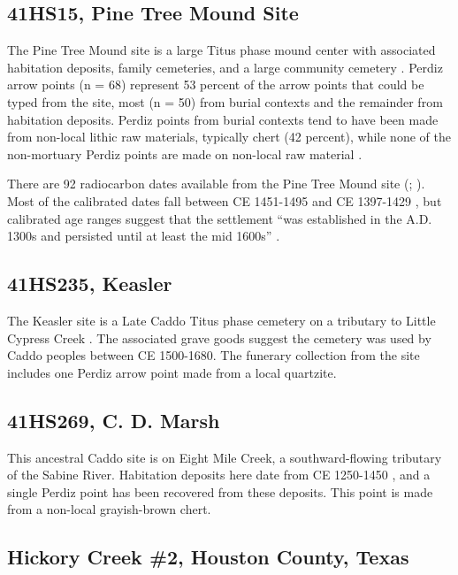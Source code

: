 \documentclass[review]{elsarticle}
\begin{document}
\subsection*{41HS15, Pine Tree Mound Site}

The Pine Tree Mound site is a large Titus phase mound center with associated habitation deposits, family cemeteries, and a large community cemetery \citep{RN5724}. Perdiz arrow points (n = 68) represent 53 percent of the arrow points that could be typed from the site, most (n = 50) from burial contexts and the remainder from habitation deposits. Perdiz points from burial contexts tend to have been made from non-local lithic raw materials, typically chert (42 percent), while none of the non-mortuary Perdiz points are made on non-local raw material \citep[566]{RN5724}.

There are 92 radiocarbon dates available from the Pine Tree Mound site  (\citealp[Table 4.13]{RN5724}; \citealp[Table 2]{RN2944}). Most of the calibrated dates fall between CE 1451-1495 and CE 1397-1429 \citep[Table 3]{RN2944}, but calibrated age ranges suggest that the settlement “was established in the A.D. 1300s and persisted until at least the mid 1600s” \citep[299]{RN5724}.

\subsection*{41HS235, Keasler}

The Keasler site is a Late Caddo Titus phase cemetery on a tributary to Little Cypress Creek \citep{RN8983}. The associated grave goods suggest the cemetery was used by Caddo peoples between CE 1500-1680. The funerary collection from the site includes one Perdiz arrow point made from a local quartzite.

\subsection*{41HS269, C. D. Marsh}

This ancestral Caddo site is on Eight Mile Creek, a southward-flowing tributary of the Sabine River. Habitation deposits here date from CE 1250-1450 \citep{RN1536}, and a single Perdiz point has been recovered from these deposits. This point is made from a non-local grayish-brown chert.

\subsection*{Hickory Creek \#2, Houston County, Texas}
\end{document}
